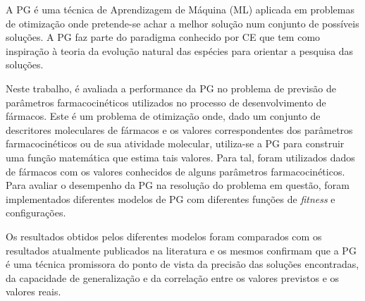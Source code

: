 \begin{resumo}
A \ac{PG} é uma técnica de Aprendizagem de Máquina (\ac{ML}) aplicada em problemas de otimização onde pretende-se achar
a melhor solução num conjunto de possíveis soluções. A \ac{PG} faz parte do paradigma conhecido por \ac{CE} que tem como inspiração 
à teoria da evolução natural das espécies para orientar a pesquisa das soluções.

Neste trabalho, é avaliada a performance da \ac{PG} no problema de previsão de parâmetros farmacocinéticos utilizados no processo 
de desenvolvimento de fármacos. Este é um problema de otimização onde, dado um conjunto de descritores moleculares de fármacos e os valores
correspondentes dos parâmetros farmacocinéticos ou de sua atividade molecular, utiliza-se a \ac{PG} para construir uma função matemática 
que estima tais valores. Para tal, foram utilizados dados de fármacos com os valores conhecidos de alguns parâmetros 
farmacocinéticos. Para avaliar o desempenho da \ac{PG} na resolução do problema em questão, foram implementados diferentes modelos de
\ac{PG} com diferentes funções de \emph{fitness} e configurações.

Os resultados obtidos pelos diferentes modelos foram comparados com os resultados atualmente publicados na literatura e os mesmos confirmam que a 
\ac{PG} é uma técnica promissora do ponto de vista da precisão das soluções encontradas, da capacidade de generalização e da correlação 
entre os valores previstos e os valores reais.
\end{resumo}